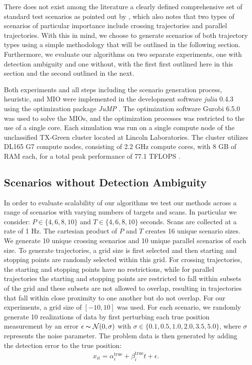There does not exist among the literature a clearly defined comprehensive set of standard test scenarios as pointed out by \cite{MTT-Taxonomy}, which also notes that two types of scenarios of particular importance include crossing trajectories and parallel trajectories. With this in mind, we choose to generate scenarios of both trajectory types using a simple methodology that will be outlined in the following section. Furthermore, we evaluate our algorithms on two separate experiments, one with detection ambiguity and one without, with the first first outlined here in this section and the second outlined in the next. 

Both experiments and all steps including the scenario generation process, heuristic, and MIO were implemented in the development software \textit{julia} 0.4.3 \cite{julia} using the optimization package \textit{JuMP} \cite{JuMP}. The optimization software Gurobi 6.5.0 \cite{gurobi} was used to solve the MIOs, and the optimization processes was restricted to the use of a single core. Each simulation was run on a single compute node of the unclassified TX-Green cluster located at Lincoln Laboratories. The cluster utilizes DL165 G7 compute nodes, consisting of 2.2 GHz compute cores, with 8 GB of RAM each, for a total peak performance of 77.1 TFLOPS \cite{LLGrid}. 

\subsection{Scenarios without Detection Ambiguity}
In order to evaluate scalability of our algorithms we test our methods across a range of scenarios with varying numbers of targets and scans. In particular we consider: $ P \in \{4,6,8,10\}$ and $T \in \{4,6,8,10\}$ seconds. Scans are collected at a rate of 1 Hz. The cartesian product of $P$ and $T$ creates 16 unique scenario sizes. We generate 10 unique crossing scenarios and 10 unique parallel scenarios of each size. To generate trajectories, a grid size is first selected and then starting and stopping points are randomly selected within this grid. For crossing trajectories, the starting and stopping points have no restrictions, while for parallel trajectories the starting and stopping points are restricted to fall within subsets of the grid and these subsets are not allowed to overlap, resulting in trajectories that fall within close proximity to one another but do not overlap. For our experiments, a grid size of $[-10,10]$ was used. For each scenario, we randomly generate 10 realizations of data by first perturbing each true position measurement by an error $\epsilon \thicksim \mathcal{N}(0,\sigma)$ with $\sigma \in \{0.1,0.5,1.0,2.0,3.5,5.0\}$, where $\sigma$ represents the noise parameter. The problem data is then generated by adding the detection error to the true position:
\begin{align*}
	x_{it} = \alpha^{\text{true}}_{i} + \beta^{\text{true}}_{i}t+\epsilon.
\end{align*}

